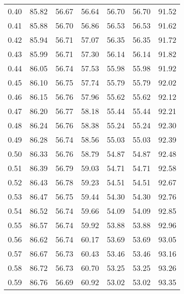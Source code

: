 \begin{tabular}{|c|c|c|c|c|c|c|}
      0.40 &     85.82 &     56.67 &      56.64 &   56.70 &      56.70 &         91.52 \\
      0.41 &     85.88 &     56.70 &      56.86 &   56.53 &      56.53 &         91.62 \\
      0.42 &     85.94 &     56.71 &      57.07 &   56.35 &      56.35 &         91.72 \\
      0.43 &     85.99 &     56.71 &      57.30 &   56.14 &      56.14 &         91.82 \\
      0.44 &     86.05 &     56.74 &      57.53 &   55.98 &      55.98 &         91.92 \\
      0.45 &     86.10 &     56.75 &      57.74 &   55.79 &      55.79 &         92.02 \\
      0.46 &     86.15 &     56.76 &      57.96 &   55.62 &      55.62 &         92.12 \\
      0.47 &     86.20 &     56.77 &      58.18 &   55.44 &      55.44 &         92.21 \\
      0.48 &     86.24 &     56.76 &      58.38 &   55.24 &      55.24 &         92.30 \\
      0.49 &     86.28 &     56.74 &      58.56 &   55.03 &      55.03 &         92.39 \\
      0.50 &     86.33 &     56.76 &      58.79 &   54.87 &      54.87 &         92.48 \\
      0.51 &     86.39 &     56.79 &      59.03 &   54.71 &      54.71 &         92.58 \\
      0.52 &     86.43 &     56.78 &      59.23 &   54.51 &      54.51 &         92.67 \\
      0.53 &     86.47 &     56.75 &      59.44 &   54.30 &      54.30 &         92.76 \\
      0.54 &     86.52 &     56.74 &      59.66 &   54.09 &      54.09 &         92.85 \\
      0.55 &     86.57 &     56.74 &      59.92 &   53.88 &      53.88 &         92.96 \\
      0.56 &     86.62 &     56.74 &      60.17 &   53.69 &      53.69 &         93.05 \\
      0.57 &     86.67 &     56.73 &      60.43 &   53.46 &      53.46 &         93.16 \\
      0.58 &     86.72 &     56.73 &      60.70 &   53.25 &      53.25 &         93.26 \\
      0.59 &     86.76 &     56.69 &      60.92 &   53.02 &      53.02 &         93.35 \\

\end{tabular}
